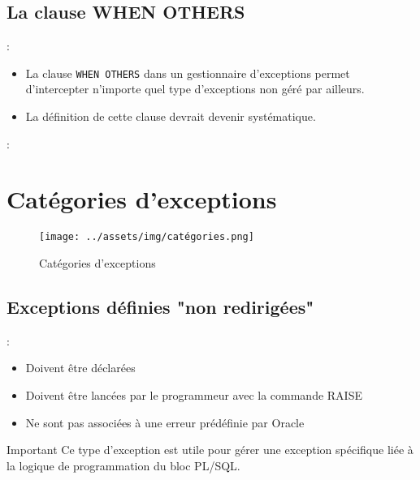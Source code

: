 \documentclass[10pt]{beamer}
\begin{document}
\subsection{La clause WHEN OTHERS}
\begin{frame}{\secname : \subsecname}
    \begin{itemize}
        \item La clause \lstinline[language=plsql]!WHEN OTHERS! dans un gestionnaire d'exceptions permet d'intercepter n'importe quel type d'exceptions non géré par ailleurs.
        \item La définition de cette clause devrait devenir systématique.
    \end{itemize}
\end{frame}

\begin{frame}{\secname : \subsecname}
    
\end{frame}

\section{Catégories d'exceptions}
\tocss

\begin{frame}{\secname}
    \begin{figure}
        \begin{center}
            \texttt{[image: ../assets/img/catégories.png]}
            \caption{Catégories d'exceptions}
        \end{center}
    \end{figure}
\end{frame}

\subsection{Exceptions définies "non redirigées"}
\begin{frame}{\secname : \subsecname}
    \begin{itemize}
        \item Doivent être déclarées
        \item Doivent être lancées par le programmeur avec la commande RAISE
        \item Ne sont pas associées à une erreur prédéfinie par Oracle
    \end{itemize}
    \begin{alertblock}{Important}
        Ce type d'exception est utile pour gérer une exception spécifique liée à la logique de programmation du bloc PL/SQL.
    \end{alertblock}

\end{frame}
\end{document}

